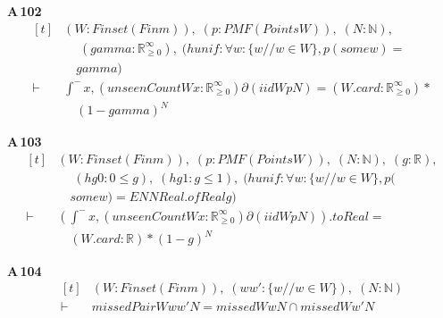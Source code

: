 \noindent\textbf{A\,102}\quad{}
{\footnotesize\[ \begin{aligned}[t]
&(\mathit{W} : \mathit{Finset} (\mathit{Fin} \mathit{m})),\; (\mathit{p} : \mathit{PMF} (\mathit{Points} \mathit{W})),\; (\mathit{N} : \mathbb{N} ),\\
&\quad \; (\mathit{gamma} : \mathbb{R}_{\geq0}^{\infty} ),\; (\mathit{hunif} : \forall \mathit{w} : \{ \mathit{w} // \mathit{w} \in \mathit{W}\} , \mathit{p} (\mathit{some} \mathit{w}) =\\
&\quad \mathit{gamma})\\
\vdash\;&\int^{-} \mathit{x}, (\mathit{unseenCount} \mathit{W} \mathit{x} : \mathbb{R}_{\geq0}^{\infty} ) ∂(\mathit{iid} \mathit{W} \mathit{p} \mathit{N}) = (\mathit{W}.\mathit{card} : \mathbb{R}_{\geq0}^{\infty} ) *\\
&\quad (1 - \mathit{gamma})^{\mathit{N}}
\end{aligned} \]}

\noindent\textbf{A\,103}\quad{}
{\footnotesize\[ \begin{aligned}[t]
&(\mathit{W} : \mathit{Finset} (\mathit{Fin} \mathit{m})),\; (\mathit{p} : \mathit{PMF} (\mathit{Points} \mathit{W})),\; (\mathit{N} : \mathbb{N} ),\; (\mathit{g} : \mathbb{R} ),\\
&\quad \; (\mathit{hg0} : 0 \leq \mathit{g}),\; (\mathit{hg1} : \mathit{g} \leq 1),\; (\mathit{hunif} : \forall \mathit{w} : \{ \mathit{w} // \mathit{w} \in \mathit{W}\} , \mathit{p} (\\
&\quad \mathit{some} \mathit{w}) = \mathit{ENNReal}.\mathit{ofReal} \mathit{g})\\
\vdash\;&(\int^{-} \mathit{x}, (\mathit{unseenCount} \mathit{W} \mathit{x} : \mathbb{R}_{\geq0}^{\infty} ) ∂(\mathit{iid} \mathit{W} \mathit{p} \mathit{N})).\mathit{toReal} =\\
&\quad (\mathit{W}.\mathit{card} : \mathbb{R} ) * (1 - \mathit{g})^{\mathit{N}}
\end{aligned} \]}

\noindent\textbf{A\,104}\quad{}
{\footnotesize\[ \begin{aligned}[t]
&(\mathit{W} : \mathit{Finset} (\mathit{Fin} \mathit{m})),\; (\mathit{w} \mathit{w'} : \{ \mathit{w} // \mathit{w} \in \mathit{W}\} ),\; (\mathit{N} : \mathbb{N} )\\
\vdash\;&\mathit{missedPair} \mathit{W} \mathit{w} \mathit{w'} \mathit{N} = \mathit{missed} \mathit{W} \mathit{w} \mathit{N} \cap \mathit{missed} \mathit{W} \mathit{w'} \mathit{N}
\end{aligned} \]}

